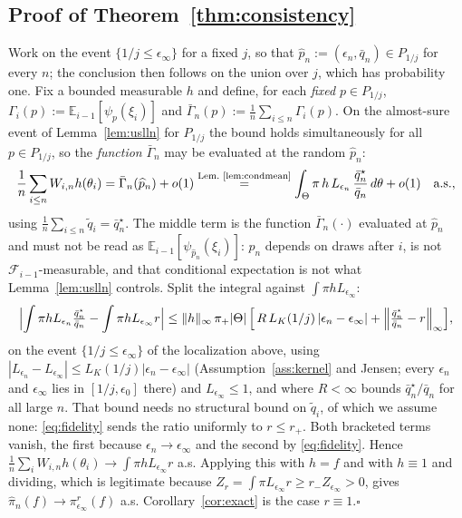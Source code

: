\documentclass[pdflatex,sn-mathphys-num]{sn-jnl}
\theoremstyle{plain}
\theoremstyle{definition}
\begin{document}
\begin{appendices}
\subsection{Proof of Theorem~\ref{thm:consistency}}\label{app:theory-consistency}
Work on the event $\{1/j\le\epsilon_\infty\}$ for a fixed $j$, so that $\widehat p_n:=(\epsilon_n,\bar q_n)\in P_{1/j}$ for every $n$; the conclusion then follows on the union over $j$, which has probability one. Fix a bounded measurable $h$ and define, for each \emph{fixed} $p\in P_{1/j}$, $\Gamma_i(p):=\mathbb{E}_{i-1}[\psi_p(\xi_i)]$ and $\bar\Gamma_n(p):=\tfrac1n\sum_{i\le n}\Gamma_i(p)$. On the almost-sure event of Lemma~\ref{lem:uslln} for $P_{1/j}$ the bound holds simultaneously for all $p\in P_{1/j}$, so the \emph{function} $\bar\Gamma_n$ may be evaluated at the random $\widehat p_n$:
\begin{equation}
\frac1n\sum_{i\le n}W_{i,n}h(\theta_i)
=\bar\Gamma_n(\widehat p_n)+o(1)
\overset{\text{Lem.\ \ref{lem:condmean}}}{=}\int_\Theta \pi\,h\,L_{\epsilon_n}\,\frac{\bar q^\star_n}{\bar q_n}\,d\theta+o(1)
\quad\text{a.s.},
\label{eq:app-consistency-main}
\end{equation}
using $\tfrac1n\sum_{i\le n}\tilde q_i=\bar q^\star_n$. The middle term is the function $\bar\Gamma_n(\cdot)$ evaluated at $\widehat p_n$ and must not be read as $\mathbb{E}_{i-1}[\psi_{\widehat p_n}(\xi_i)]$: $\widehat p_n$ depends on draws after $i$, is not $\mathcal{F}_{i-1}$-measurable, and that conditional expectation is not what Lemma~\ref{lem:uslln} controls. Split the integral against $\int\pi hL_{\epsilon_\infty}$:
\[
\Bigl|\int \pi h L_{\epsilon_n}\tfrac{\bar q^\star_n}{\bar q_n}-\int\pi hL_{\epsilon_\infty}r\Bigr|
\le \|h\|_\infty\,\pi_+|\Theta|\,\Bigl[\,R\,L_K(1/j)\,|\epsilon_n-\epsilon_\infty|
+\Bigl\|\tfrac{\bar q^\star_n}{\bar q_n}-r\Bigr\|_\infty\Bigr],
\]
on the event $\{1/j\le\epsilon_\infty\}$ of the localization above, using $|L_{\epsilon_n}-L_{\epsilon_\infty}|\le L_K(1/j)|\epsilon_n-\epsilon_\infty|$ (Assumption~\ref{ass:kernel} and Jensen; every $\epsilon_n$ and $\epsilon_\infty$ lies in $[1/j,\epsilon_0]$ there) and $L_{\epsilon_\infty}\le1$, and where $R<\infty$ bounds $\bar q^\star_n/\bar q_n$ for all large $n$. That bound needs no structural bound on $\tilde q_i$, of which we assume none: \eqref{eq:fidelity} sends the ratio uniformly to $r\le r_+$. Both bracketed terms vanish, the first because $\epsilon_n\to\epsilon_\infty$ and the second by \eqref{eq:fidelity}. Hence $\tfrac1n\sum_iW_{i,n}h(\theta_i)\to\int\pi hL_{\epsilon_\infty}r$ a.s. Applying this with $h=f$ and with $h\equiv1$ and dividing, which is legitimate because $Z_r=\int\pi L_{\epsilon_\infty}r\ge r_-Z_{\epsilon_\infty}>0$, gives $\widehat\pi_n(f)\to\pi^r_{\epsilon_\infty}(f)$ a.s. Corollary~\ref{cor:exact} is the case $r\equiv1$.\hfill$\square$


\end{appendices}
\end{document}
